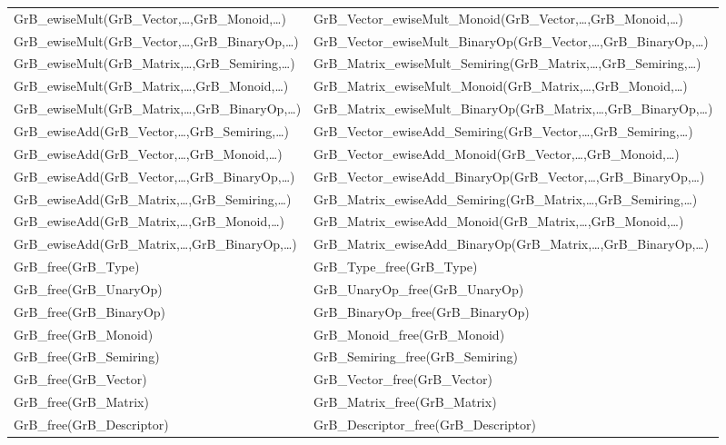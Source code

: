 \begin{table}[htb]
{\begin{tabular}{l|l}
{\sf GrB\_ewiseMult(GrB\_Vector,\ldots,GrB\_Monoid,\ldots)} 	& {\sf GrB\_Vector\_ewiseMult\_Monoid(GrB\_Vector,\ldots,GrB\_Monoid,\ldots)} \\
{\sf GrB\_ewiseMult(GrB\_Vector,\ldots,GrB\_BinaryOp,\ldots)} 	& {\sf GrB\_Vector\_ewiseMult\_BinaryOp(GrB\_Vector,\ldots,GrB\_BinaryOp,\ldots)} \\
{\sf GrB\_ewiseMult(GrB\_Matrix,\ldots,GrB\_Semiring,\ldots)} 	& {\sf GrB\_Matrix\_ewiseMult\_Semiring(GrB\_Matrix,\ldots,GrB\_Semiring,\ldots)} \\
{\sf GrB\_ewiseMult(GrB\_Matrix,\ldots,GrB\_Monoid,\ldots)} 	& {\sf GrB\_Matrix\_ewiseMult\_Monoid(GrB\_Matrix,\ldots,GrB\_Monoid,\ldots)} \\
{\sf GrB\_ewiseMult(GrB\_Matrix,\ldots,GrB\_BinaryOp,\ldots)} 	& {\sf GrB\_Matrix\_ewiseMult\_BinaryOp(GrB\_Matrix,\ldots,GrB\_BinaryOp,\ldots)} \\ \hline
{\sf GrB\_ewiseAdd(GrB\_Vector,\ldots,GrB\_Semiring,\ldots)} 	& {\sf GrB\_Vector\_ewiseAdd\_Semiring(GrB\_Vector,\ldots,GrB\_Semiring,\ldots)} \\
{\sf GrB\_ewiseAdd(GrB\_Vector,\ldots,GrB\_Monoid,\ldots)} 	& {\sf GrB\_Vector\_ewiseAdd\_Monoid(GrB\_Vector,\ldots,GrB\_Monoid,\ldots)} \\
{\sf GrB\_ewiseAdd(GrB\_Vector,\ldots,GrB\_BinaryOp,\ldots)} 	& {\sf GrB\_Vector\_ewiseAdd\_BinaryOp(GrB\_Vector,\ldots,GrB\_BinaryOp,\ldots)} \\
{\sf GrB\_ewiseAdd(GrB\_Matrix,\ldots,GrB\_Semiring,\ldots)} 	& {\sf GrB\_Matrix\_ewiseAdd\_Semiring(GrB\_Matrix,\ldots,GrB\_Semiring,\ldots)} \\
{\sf GrB\_ewiseAdd(GrB\_Matrix,\ldots,GrB\_Monoid,\ldots)} 	& {\sf GrB\_Matrix\_ewiseAdd\_Monoid(GrB\_Matrix,\ldots,GrB\_Monoid,\ldots)} \\
{\sf GrB\_ewiseAdd(GrB\_Matrix,\ldots,GrB\_BinaryOp,\ldots)} 	& {\sf GrB\_Matrix\_ewiseAdd\_BinaryOp(GrB\_Matrix,\ldots,GrB\_BinaryOp,\ldots)} \\ \hline
{\sf GrB\_free(GrB\_Type)}					& {\sf GrB\_Type\_free(GrB\_Type)} \\
{\sf GrB\_free(GrB\_UnaryOp)}					& {\sf GrB\_UnaryOp\_free(GrB\_UnaryOp)} \\
{\sf GrB\_free(GrB\_BinaryOp)}					& {\sf GrB\_BinaryOp\_free(GrB\_BinaryOp)} \\
{\sf GrB\_free(GrB\_Monoid)}					& {\sf GrB\_Monoid\_free(GrB\_Monoid)} \\
{\sf GrB\_free(GrB\_Semiring)}					& {\sf GrB\_Semiring\_free(GrB\_Semiring)} \\
{\sf GrB\_free(GrB\_Vector)}					& {\sf GrB\_Vector\_free(GrB\_Vector)} \\
{\sf GrB\_free(GrB\_Matrix)}					& {\sf GrB\_Matrix\_free(GrB\_Matrix)} \\
{\sf GrB\_free(GrB\_Descriptor)}				& {\sf GrB\_Descriptor\_free(GrB\_Descriptor)} \\ \hline
\end{tabular}
}
\label{Tab:NonPolymorphic1}
\end{table}

